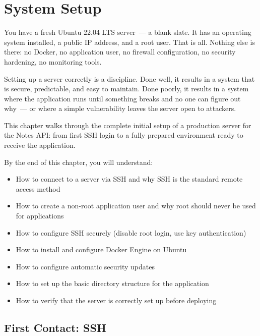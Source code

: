 \setcounter{chapter}{20}
\chapter{System Setup}\label{ch:21-system-setup}

\chapterrule

You have a fresh Ubuntu 22.04 LTS server~--- a blank slate. It has an operating system installed, a public IP address, and a root user. That is all. Nothing else is there: no Docker, no application user, no firewall configuration, no security hardening, no monitoring tools.

Setting up a server correctly is a discipline. Done well, it results in a system that is secure, predictable, and easy to maintain. Done poorly, it results in a system where the application runs until something breaks and no one can figure out why~--- or where a simple vulnerability leaves the server open to attackers.

This chapter walks through the complete initial setup of a production server for the Notes API: from first SSH login to a fully prepared environment ready to receive the application.

\begin{objectives}

By the end of this chapter, you will understand:

\begin{itemize}
\tightlist
\item
  How to connect to a server via SSH and why SSH is the standard remote access method
\item
  How to create a non-root application user and why root should never be used for applications
\item
  How to configure SSH securely (disable root login, use key authentication)
\item
  How to install and configure Docker Engine on Ubuntu
\item
  How to configure automatic security updates
\item
  How to set up the basic directory structure for the application
\item
  How to verify that the server is correctly set up before deploying
\end{itemize}

\end{objectives}

\setcounter{section}{0}
\section{First Contact: SSH}\label{21-system-setup:211-first-contact-ssh}

